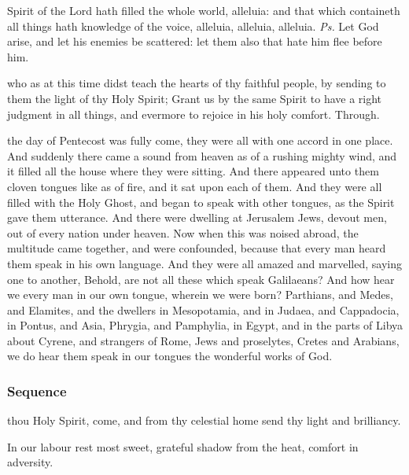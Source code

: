 
\introit
{} Spirit of the Lord hath filled the whole world, alleluia: and that which containeth all things hath knowledge of the voice, alleluia, alleluia, alleluia. \textit{Ps.} Let God arise, and let his enemies be scattered: let them also that hate him flee before him.

\collect
{} who as at this time didst teach the hearts of thy faithful people, by sending to them the light of thy Holy Spirit; Grant us by the same Spirit to have a right judgment in all things, and evermore to rejoice in his holy comfort. Through.

 the day of Pentecost was fully come, they were all with one accord in one place. And suddenly there came a sound from heaven as of a rushing mighty wind, and it filled all the house where they were sitting. And there appeared unto them cloven tongues like as of fire, and it sat upon each of them. And they were all filled with the Holy Ghost, and began to speak with other tongues, as the Spirit gave them utterance. And there were dwelling at Jerusalem Jews, devout men, out of every nation under heaven. Now when this was noised abroad, the multitude came together, and were confounded, because that every man heard them speak in his own language. And they were all amazed and marvelled, saying one to another, Behold, are not all these which speak Galilaeans? And how hear we every man in our own tongue, wherein we were born? Parthians, and Medes, and Elamites, and the dwellers in Mesopotamia, and in Judaea, and Cappadocia, in Pontus, and Asia, Phrygia, and Pamphylia, in Egypt, and in the parts of Libya about Cyrene, and strangers of Rome, Jews and proselytes, Cretes and Arabians, we do hear them speak in our tongues the wonderful works of God.


\subsubsection{Sequence}\label{WhitSeq}
 thou Holy Spirit, come, and from thy celestial home send thy light and brilliancy.

In our labour rest most sweet, grateful shadow from the heat, comfort in adversity.

